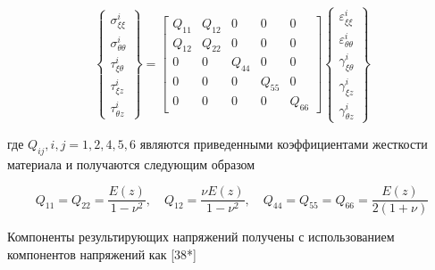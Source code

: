 \begin{equation}
	\label{eq:vibro1:9}
	\begin{Bmatrix}
		\sigma_{\xi \xi}^i \\
		\sigma_{\theta \theta}^i \\
		\tau_{\xi \theta}^i \\
		\tau_{\xi z}^i \\
		\tau_{\theta z}^i
	\end{Bmatrix} =
	\begin{bmatrix}
		Q_{11} & Q_{12} & 0       & 0  	  & 0 \\
		Q_{12} & Q_{22} & 0       & 0     & 0 \\
		 0     &     0  & Q_{44}  & 0 	  & 0 \\
		 0     &     0  & 0       & Q_{55}& 0 \\
		 0     &     0  & 0       & 0     &  Q_{66}
	\end{bmatrix}
	\begin{Bmatrix}
		\varepsilon_{\xi \xi}^i \\
		\varepsilon_{\theta \theta}^i \\
		\gamma_{\xi \theta}^i \\
		\gamma_{\xi z}^i \\
		\gamma_{\theta z}^i
	\end{Bmatrix}
\end{equation}

где \(Q_{ij}, i,j =1, 2, 4, 5, 6\) являются приведенными коэффициентами жесткости материала и получаются следующим образом

\begin{equation}
	\label{eq:vibro1:10}
	Q_{11} = Q_{22} = \frac{E(z)}{1-\nu^2}, \quad Q_{12}=\frac{\nu E(z)}{1-\nu^2}, \quad Q_{44}=Q_{55}=Q_{66}=\frac{E(z)}{2(1+\nu)}
\end{equation}

Компоненты результирующих напряжений получены с использованием компонентов напряжений как [38*]

